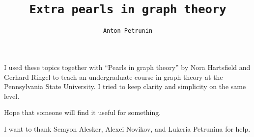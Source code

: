 \title{\tt Extra pearls in graph theory}
\author{\tt Anton Petrunin}
\date{}
\maketitle

I used these topics together with ``Pearls in graph theory'' by Nora Hartsfield and Gerhard Ringel \cite{pearls} to teach an undergraduate course in graph theory at the Pennsylvania State University.
I tried to keep clarity and simplicity on the same level.

Hope that someone will find it useful for something.

\medskip

I want to thank 
Semyon Alesker,
Alexei Novikov,
and Lukeria Petrunina for help.

\null\vfill{}


\thispagestyle{empty}
\newpage
\tableofcontents
